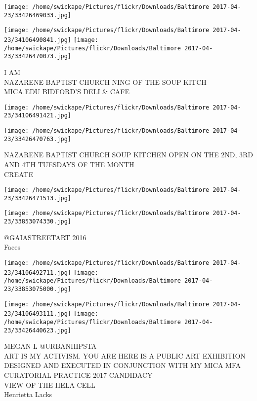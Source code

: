 \documentclass[10pt,letterpaper]{article}
\begin{document}
\texttt{[image: /home/swickape/Pictures/flickr/Downloads/Baltimore 2017-04-23/33426469033.jpg]}

\vspace{0.25in}
\texttt{[image: /home/swickape/Pictures/flickr/Downloads/Baltimore 2017-04-23/34106490841.jpg]}
\texttt{[image: /home/swickape/Pictures/flickr/Downloads/Baltimore 2017-04-23/33426470073.jpg]}

I AM\\
NAZARENE BAPTIST CHURCH NING OF THE SOUP KITCH\\
MICA.EDU BIDFORD'S DELI \& CAFE\\
\pagebreak

\texttt{[image: /home/swickape/Pictures/flickr/Downloads/Baltimore 2017-04-23/34106491421.jpg]}

\vspace{0.25in}
\texttt{[image: /home/swickape/Pictures/flickr/Downloads/Baltimore 2017-04-23/33426470763.jpg]}

NAZARENE BAPTIST CHURCH SOUP KITCHEN OPEN ON THE 2ND, 3RD AND 4TH TUESDAYS OF THE MONTH\\
CREATE\\
\pagebreak

\texttt{[image: /home/swickape/Pictures/flickr/Downloads/Baltimore 2017-04-23/33426471513.jpg]}

\vspace{0.25in}
\texttt{[image: /home/swickape/Pictures/flickr/Downloads/Baltimore 2017-04-23/33853074330.jpg]}

@GAIASTREETART 2016\\
Faces\\
\pagebreak

\texttt{[image: /home/swickape/Pictures/flickr/Downloads/Baltimore 2017-04-23/34106492711.jpg]}
\texttt{[image: /home/swickape/Pictures/flickr/Downloads/Baltimore 2017-04-23/33853075000.jpg]}

\texttt{[image: /home/swickape/Pictures/flickr/Downloads/Baltimore 2017-04-23/34106493111.jpg]}
\texttt{[image: /home/swickape/Pictures/flickr/Downloads/Baltimore 2017-04-23/33426440623.jpg]}

MEGAN L @URBANHIPSTA\\
ART IS MY ACTIVISM.  YOU ARE HERE IS A PUBLIC ART EXHIBITION DESIGNED AND EXECUTED IN CONJUNCTION WITH MY MICA MFA CURATORIAL PRACTICE 2017 CANDIDACY\\
VIEW OF THE HELA CELL\\
Henrietta Lacks\\
\pagebreak
\end{document}
